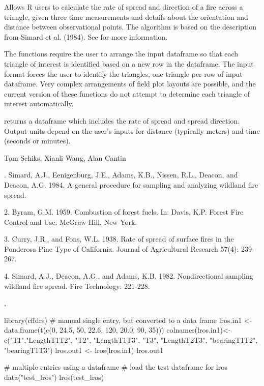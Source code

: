 \documentclass[a4paper]{book}
\begin{document}
%
\begin{Details}\relax
{} Allows R users to calculate the rate of spread and direction of
a fire across a triangle, given three time measurements and details about
the orientation and distance between observational points. The algorithm is
based on the description from Simard et al. (1984). See  for more
information.

The functions require the user to arrange the input dataframe so that each
triangle of interest is identified based on a new row in the dataframe. The
input format forces the user to identify the triangles, one triangle per row
of input dataframe. Very complex arrangements of field plot layouts are
possible, and the current version of these functions do not attempt to
determine each triangle of interest automatically.
\end{Details}
%
\begin{Value}
 returns a dataframe which includes the rate of spread
and spread direction. Output units depend on the user’s inputs for
distance (typically meters) and time (seconds or minutes).
\end{Value}
%
\begin{Author}\relax
Tom Schiks, Xianli Wang, Alan Cantin
\end{Author}
%
\begin{References}. Simard, A.J., Eenigenburg, J.E., Adams, K.B., Nissen, R.L.,
Deacon, and Deacon, A.G. 1984. A general procedure for sampling and
analyzing wildland fire spread.

2. Byram, G.M. 1959. Combustion of forest fuels. In: Davis, K.P. Forest Fire
Control and Use. McGraw-Hill, New York.

3. Curry, J.R., and Fons, W.L. 1938. Rate of spread of surface fires in the
Ponderosa Pine Type of California. Journal of Agricultural Research 57(4):
239-267.

4. Simard, A.J., Deacon, A.G., and Adams, K.B. 1982. Nondirectional sampling
wildland fire spread. Fire Technology: 221-228.
\end{References}
%
\begin{SeeAlso}\relax
{},
\end{SeeAlso}
%
\begin{Examples}
\begin{ExampleCode}

library(cffdrs)
# manual single entry, but converted to a data frame
lros.in1 <- data.frame(t(c(0, 24.5, 50, 22.6, 120, 20.0, 90, 35)))
colnames(lros.in1)<-c("T1","LengthT1T2", "T2", "LengthT1T3", "T3", 
                      "LengthT2T3", "bearingT1T2", "bearingT1T3")
lros.out1 <- lros(lros.in1)
lros.out1

# multiple entries using a dataframe
# load the test dataframe for lros
data("test_lros")
lros(test_lros)



\end{ExampleCode}
\end{Examples}
\end{document}
